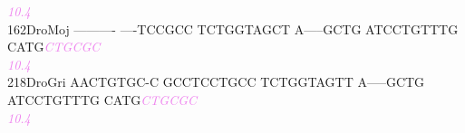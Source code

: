 \documentclass[11pt,twoside,reqno,a4paper]{article}
\begin{document}
{\hspace*{4\charwidth}\hspace*{7\charwidth}\hspace*{1\charwidth}\hspace*{1\charwidth}\hspace*{1\charwidth}\hspace*{1\charwidth}\hspace*{1\charwidth}\hspace*{54\charwidth}\textit{\textcolor{violet}{10.4}}\hspace*{1\charwidth}\\
162\hspace*{1\charwidth}DroMoj	----------	----TCCGCC	TCTGGTAGCT	A-----GCTG	ATCCTGTTTG	CATG\textit{\textcolor{violet}{C}}\textit{\textcolor{violet}{T}}\textit{\textcolor{violet}{G}}\textit{\textcolor{violet}{C}}\textit{\textcolor{violet}{G}}\textit{\textcolor{violet}{C}}	\\
\hspace*{4\charwidth}\hspace*{7\charwidth}\hspace*{1\charwidth}\hspace*{1\charwidth}\hspace*{1\charwidth}\hspace*{1\charwidth}\hspace*{1\charwidth}\hspace*{54\charwidth}\textit{\textcolor{violet}{10.4}}\hspace*{1\charwidth}\\
218\hspace*{1\charwidth}DroGri	AACTGTGC-C	GCCTCCTGCC	TCTGGTAGTT	A-----GCTG	ATCCTGTTTG	CATG\textit{\textcolor{violet}{C}}\textit{\textcolor{violet}{T}}\textit{\textcolor{violet}{G}}\textit{\textcolor{violet}{C}}\textit{\textcolor{violet}{G}}\textit{\textcolor{violet}{C}}	\\
\hspace*{4\charwidth}\hspace*{7\charwidth}\hspace*{1\charwidth}\hspace*{1\charwidth}\hspace*{1\charwidth}\hspace*{1\charwidth}\hspace*{1\charwidth}\hspace*{54\charwidth}\textit{\textcolor{violet}{10.4}}\hspace*{1\charwidth}\\
\\
}
\end{document}
